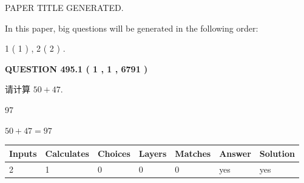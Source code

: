 \documentclass{ctexart}
\begin{document}
   
 \vspace{0.2in}
 
 
 
 
   
   
 PAPER TITLE GENERATED.
   
   
   
\vspace{0.2in}
   
In this paper, big questions will be generated in the following order: 
   
   
   1 ( 1 )
 ,
   2 ( 2 )
 .
  
\vspace{0.2in}
  
{\textbf{\Large{QUESTION
495.1 
 ( 1 , 1 , 6791 )
}}}
  
  
 
请计算 $ %
50 +  %
47 $.
 
 
 
\noindent{}
 
 

97
 
 
\noindent{}
 
 

 
 
 
\noindent{}
 
 

$ %
50 +  %
47=   %
97$
 
 
\noindent{}
 
 

 
   
   
   
   
\noindent\begin{tabular}{|l|l|l|l|l|l|l|}
 \hline
Inputs & Calculates & Choices & Layers & Matches & Answer & Solution \\ \hline
 2  & 
 1  & 
 0
  & 
 0  & 
 0  & 
  yes & 
  yes 
  \\ \hline
 \end{tabular}
   
   
   
   
\noindent{}
   
   
  
\end{document}
